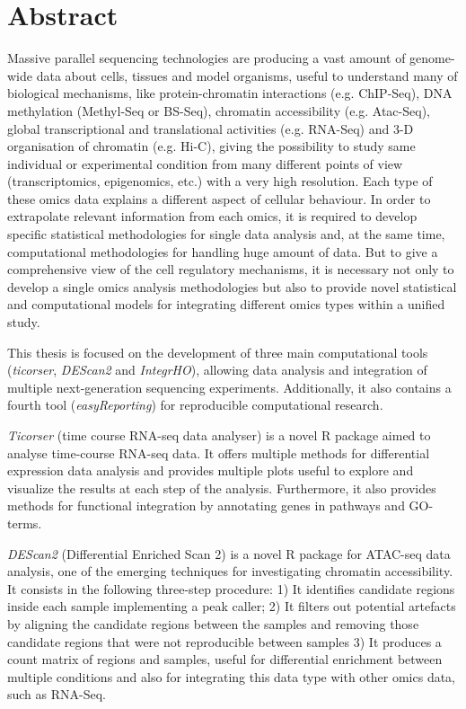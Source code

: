 \section*{Abstract}
{\setlength{\parindent}{0cm}
Massive parallel sequencing technologies are producing a vast amount of genome-wide data about cells, tissues and model organisms, useful to understand many of biological mechanisms, like protein-chromatin interactions (e.g. ChIP-Seq), DNA methylation (Methyl-Seq or BS-Seq), chromatin accessibility (e.g. Atac-Seq), global transcriptional and translational activities (e.g. RNA-Seq) and 3-D organisation of chromatin (e.g. Hi-C), giving the possibility to study same individual or experimental condition from many different points of view (transcriptomics, epigenomics, etc.) with a very high resolution. Each type of these omics data explains a different aspect of cellular behaviour.
In order to extrapolate relevant information from each omics, it is required to develop specific statistical methodologies for single data analysis and, at the same time, computational methodologies for handling huge amount of data.
But to give a comprehensive view of the cell regulatory mechanisms, it is necessary not only to develop a single omics analysis methodologies but also to provide novel statistical and computational models for integrating different omics types within a unified study.

This thesis is focused on the development of three main computational tools (\textit{ticorser}, \textit{DEScan2} and \textit{IntegrHO}), allowing data analysis and integration of multiple next-generation sequencing experiments.
Additionally, it also contains a fourth tool (\textit{easyReporting}) for reproducible computational research.

\textit{Ticorser} (time course RNA-seq data analyser) is a novel R package aimed to analyse time-course RNA-seq data. It offers multiple methods for differential expression data analysis and provides multiple plots useful to explore and visualize the results at each step of the analysis. Furthermore, it also provides methods for functional integration by annotating genes in pathways and GO-terms.

\textit{DEScan2} (Differential Enriched Scan 2) is a novel R package for ATAC-seq data analysis, one of the emerging techniques for investigating chromatin accessibility. It consists in the following three-step procedure: 1) It identifies candidate regions inside each sample implementing a peak caller; 2) It filters out potential artefacts by aligning the candidate regions between the samples and removing those candidate regions that were not reproducible between samples 3) It produces a count matrix of regions and samples, useful for differential enrichment between multiple conditions and also for integrating this data type with other omics data, such as RNA-Seq.

}

